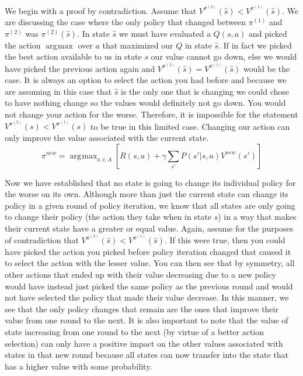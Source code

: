 \documentclass[solution, letterpaper]{cs121}
\DeclareMathOperator*{\argmax}{\arg\!\max}
\begin{document}
We begin with a proof by contradiction. Assume that  $V^{\pi^{(2)}} (\hat{s}) < V^{\pi^{(1)}}(\hat{s})$. We are discussing the case where the only policy that changed between  $\pi^{(1)}$ and $\pi^{(2)}$ was $\pi^{(2)}(\hat{s})$. In state $\hat{s}$ we must have evaluated a $Q(s,a)$ and picked the action $\argmax$ over $a$ that maximized our $Q$ in state $\hat{s}$. If in fact we picked the best action available to us in state $s$ our value cannot go down, else we would have picked the previous action again and $V^{\pi^{(2)}} (\hat{s}) = V^{\pi^{(1)}}(\hat{s})$ would be the case. It is always an option to select the action you had before and because we are assuming in this case that $\hat{s}$ is the only one that is changing we could chose to have nothing change so the values would definitely not go down. You would not change your action for the worse. Therefore, it is impossible for the statement $V^{\pi^{(2)}} (s) < V^{\pi^{(1)}}(s)$ to be true in this limited case. Changing our action can only improve the value associated with the current state.
\[\pi^{new} = \argmax_{a \in A}  \left[ R(s,a ) + \gamma \sum_{s'} P(s' | s,a)V^{new}(s')\right ]\] 

Now we have established that no state is going to change its individual policy for the worse on its own. Although more than just the current state can change its policy in a given round of policy iteration, we know that all states are only going to change their policy (the action they take when in state $s$) in a way that makes their current state have a greater or equal value. 
Again, assume for the purposes of contradiction that $V^{\pi^{(2)}} (\hat{s}) < V^{\pi^{(1)}}(\hat{s})$. If this were true, then you could have picked the action you picked before policy iteration changed that caused it to select the action with the lesser value. You can then see that by symmetry, all other actions that ended up with their value decreasing due to a new policy would have instead just picked the same policy as the previous round and would not have selected the policy that made their value decrease. In this manner, we see that the only policy changes that remain are the ones that improve their value from one round to the next. It is also important to note that the value of state increasing from one round to the next (by virtue of a better action selection) can only have a positive impact on the other values associated with states in that new round because all states can now transfer into the state that has a higher value with some probability. 
\end{document}
